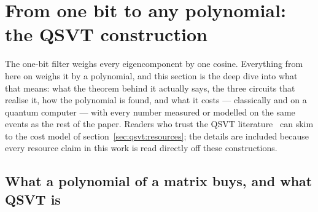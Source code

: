 \documentclass[11pt,a4paper]{article}
\begin{document}
\section{From one bit to any polynomial: the QSVT construction}
\label{sec:qsvt}

The one-bit filter weighs every eigencomponent by one cosine. Everything
from here on weighs it by a polynomial, and this section is the deep dive
into what that means: what the theorem behind it actually says, the three
circuits that realise it, how the polynomial is found, and what it costs
--- classically and on a quantum computer --- with every number measured or
modelled on the same events as the rest of the paper.
Readers who trust the QSVT
literature~\cite{gslw2019,lowchuang2019,childs2012,martyn2021} can skim to
the cost model of section~\ref{sec:qsvt:resources}; the details are
included because every resource claim in this work is read directly off
these constructions.

\subsection{What a polynomial of a matrix buys, and what QSVT is}
\label{sec:qsvt:what}
\end{document}
